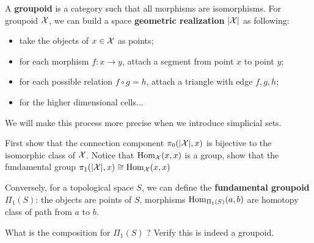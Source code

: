 \begin{example}[{ Groupoid }]
  A \textbf{ groupoid } is a category such that all morphisms are isomorphisms. For groupoid $\mathcal{X}$, we can build a space \textbf{geometric realization} $|\mathcal{X}|$ as following: 
  \begin{itemize}
    \item take the objects of $x\in \mathcal{X}$ as points;
    \item for each morphism $f:x \to y$, attach a segment from point $x$ to point $y$;
    \item for each possible relation $f\circ g =h $, attach a triangle with edge $f,g,h$;
    \item for the higher dimensional cells$\ldots$ 
  \end{itemize}
  We will make this process more precise when we introduce simplicial sets.
  \begin{exercise}
  First show that the connection component $\pi_0(|\mathcal{X}|,x)$ is bijective to the isomorphic class of $\mathcal{X}$. Notice that $\mathrm{Hom}_{\mathcal{X}}(x,x)$ is a group, show that the fundamental group $\pi_1(|\mathcal{X}|,x)\cong \mathrm{Hom}_{\mathcal{X}}(x,x)$
  \end{exercise}
  Conversely, for a topological space $S$, we can define the \textbf{fundamental groupoid} $\Pi_1(S)$: the objects are points of $S$, morphisms $\mathrm{Hom}_{\Pi_1(S)}(a,b)$ are homotopy class of path from $a$ to $b$.
  \begin{exercise}
    What is the composition for $\Pi_1(S)$ ? Verify this is indeed a groupoid.
  \end{exercise}
\end{example}

